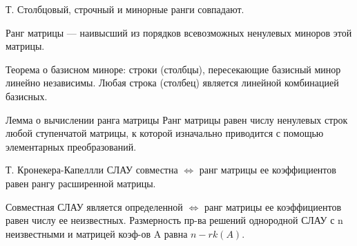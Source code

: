 \documentclass{article}
\begin{document}
Т. Столбцовый, строчный и минорные ранги совпадают.

\textsf{Ранг матрицы} — наивысший из порядков всевозможных ненулевых миноров этой матрицы.

\textsf{Теорема о базисном миноре:} строки (столбцы), пересекающие базисный минор линейно независимы. Любая строка (столбец) является линейной комбинацией базисных.

\textsf{Лемма о вычислении ранга матрицы}
Ранг матрицы равен числу ненулевых строк любой ступенчатой матрицы, к которой изначально приводится с помощью элементарных преобразований.

\textsf{Т. Кронекера-Капеллли} СЛАУ совместна $\Leftrightarrow$ ранг матрицы ее коэффициентов равен рангу расширенной матрицы.

Совместная СЛАУ является определенной $\Leftrightarrow$ ранг матрицы ее коэффициентов равен числу ее неизвестных. Размерность пр-ва решений однородной СЛАУ с n неизвестными и матрицей коэф-ов A равна $n-rk(A)$.
\end{document}
